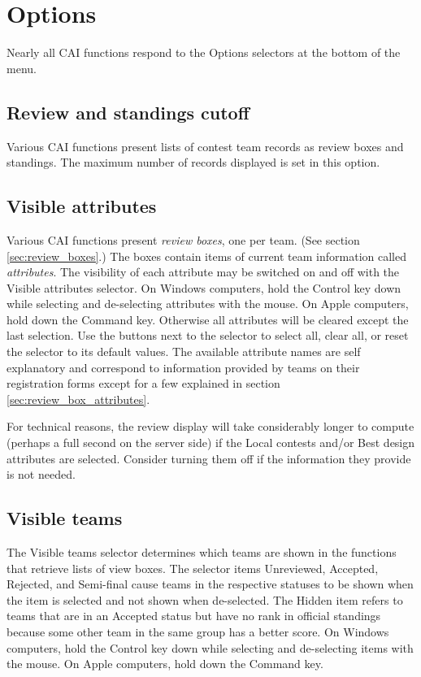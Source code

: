 \documentclass[11pt,letterpaper]{refart}
\def\ui#1{\textsf{#1}}
\begin{document}
\section{Options}
Nearly all CAI functions respond to the \ui{Options} selectors at the
bottom of the menu.

\subsection{Review and standings cutoff}
Various CAI functions present lists of contest team records as review
boxes and standings. The maximum
number of records displayed is set in this option.
 
\subsection{Visible attributes}
Various CAI functions present \emph{review boxes}, one per team.  (See
section \ref{sec:review_boxes}.) The boxes contain items of current
team information called \emph{attributes}.  The visibility of each
attribute may be switched on and off with the \ui{Visible attributes}
selector. On Windows computers, hold the Control key down while
selecting and de-selecting attributes with the mouse. On Apple
computers, hold down the Command key. Otherwise all attributes will be
cleared except the last selection. Use the buttons next to the
selector to select all, clear all, or reset the selector to its
default values. The available attribute names are self explanatory and
correspond to information provided by teams on their registration
forms except for a few explained in section
\ref{sec:review_box_attributes}.

For technical reasons, the review display will take considerably
longer to compute (perhaps a full second on the server side) if the
\ui{Local contests} and/or \ui{Best design} attributes are
selected. Consider turning them off if the information they provide is
not needed.

\subsection{Visible teams}
The \ui{Visible teams} selector determines which teams are shown in
the functions that retrieve lists of view boxes. The selector items
\ui{Unreviewed}, \ui{Accepted}, \ui{Rejected}, and \ui{Semi-final}
cause teams in the respective statuses to be shown when the item is
selected and not shown when de-selected.  The \ui{Hidden} item refers
to teams that are in an \ui{Accepted} status but have no rank in
official standings because some other team in the same group has a
better score. On Windows computers, hold the Control key down while
selecting and de-selecting items with the mouse. On Apple computers,
hold down the Command key.
\end{document}
